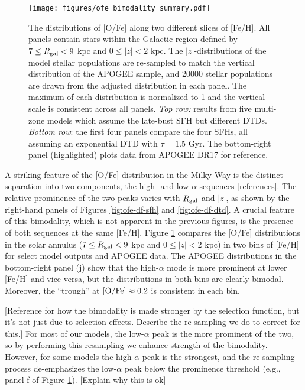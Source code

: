 \documentclass[twocolumn,twocolappendix,linenumbers,trackchanges]{aastex631}
\begin{document}
\begin{figure*}
    \centering
    \texttt{[image: figures/ofe\_bimodality\_summary.pdf]}
    \caption{The distributions of [O/Fe] along two different slices of [Fe/H]. 
    All panels contain stars within the Galactic region defined by $7\leq R_{\rm gal}<9$ kpc and $0\leq|z|<2$ kpc. The $|z|$-distributions of the model stellar populations are re-sampled to match the vertical distribution of the APOGEE sample, and \num{20000} stellar populations are drawn from the adjusted distribution in each panel. The maximum of each distribution is normalized to 1 and the vertical scale is consistent across all panels.
    \textit{Top row:} results from five multi-zone models which assume the late-bust SFH but different DTDs. \textit{Bottom row}: the first four panels compare the four SFHs, all assuming an exponential DTD with $\tau=1.5$ Gyr. The bottom-right panel (highlighted) plots data from APOGEE DR17 for reference.}
    \label{fig:ofe-bimodality}
\end{figure*}

A striking feature of the [O/Fe] distribution in the Milky Way is the distinct separation into two components, the high- and low-$\alpha$ sequences [references]. The relative prominence of the two peaks varies with $R_{\rm gal}$ and $|z|$, as shown by the right-hand panels of Figures \ref{fig:ofe-df-sfh} and \ref{fig:ofe-df-dtd}. A crucial feature of this bimodality, which is not apparent in the previous figures, is the presence of both sequences at the same [Fe/H]. Figure \ref{fig:ofe-bimodality} compares the [O/Fe] distributions in the solar annulus ($7\leq R_{\rm gal}<9$ kpc and $0\leq|z|<2$ kpc) in two bins of [Fe/H] for select model outputs and APOGEE data. The APOGEE distributions in the bottom-right panel (j) show that the high-$\alpha$ mode is more prominent at lower [Fe/H] and vice versa, but the distributions in both bins are clearly bimodal. Moreover, the ``trough'' at ${\rm [O/Fe]}\approx0.2$ is consistent in each bin.

[Reference \citet{Vincenzo2021-AlphaDistribution} for how the bimodality is made stronger by the selection function, but it's not just due to selection effects. Describe the re-sampling we do to correct for this.]
For most of our models, the low-$\alpha$ peak is the more prominent of the two, so by performing this resampling we enhance strength of the bimodality. However, for some models the high-$\alpha$ peak is the strongest, and the re-sampling process de-emphasizes the low-$\alpha$ peak below the prominence threshold (e.g., panel f of Figure \ref{fig:ofe-bimodality}). [Explain why this is ok]
\end{document}
